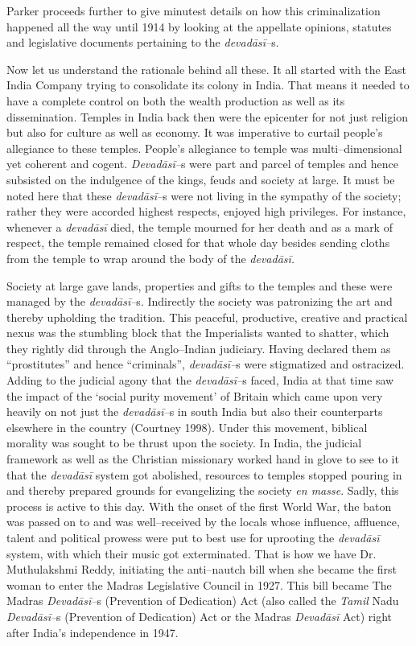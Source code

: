 Parker proceeds further to give minutest details on how this criminalization happened all the way until 1914 by looking at the appellate opinions, statutes and legislative documents pertaining to the \textit{devadāsī–}s.

Now let us understand the rationale behind all these. It all started with the East India Company trying to consolidate its colony in India. That means it needed to have a complete control on both the wealth production as well as its dissemination. Temples in India back then were the epicenter for not just religion but also for culture as well as economy. It was imperative to curtail people’s allegiance to these temples. People’s allegiance to temple was multi–dimensional yet coherent and cogent. \textit{Devadāsī–}s were part and parcel of temples and hence subsisted on the indulgence of the kings, feuds and society at large. It must be noted here that these \textit{devadāsī–}s were not living in the sympathy of the society; rather they were accorded highest respects, enjoyed high privileges. For instance, whenever a \textit{devadāsī }died, the temple mourned for her death and as a mark of respect, the temple remained closed for that whole day besides sending cloths from the temple to wrap around the body of the \textit{devadāsī.}

Society at large gave lands, properties and gifts to the temples and these were managed by the \textit{devadāsī–}s. Indirectly the society was patronizing the art and thereby upholding the tradition. This peaceful, productive, creative and practical nexus was the stumbling block that the Imperialists wanted to shatter, which they rightly did through the Anglo–Indian judiciary. Having declared them as “prostitutes” and hence “criminals”, \textit{devadāsī–}s were stigmatized and ostracized. Adding to the judicial agony that the \textit{devadāsī–}s faced, India at that time saw the impact of the ‘social purity movement’ of Britain which came upon very heavily on not just the \textit{devadāsī–}s in south India but also their counterparts elsewhere in the country (Courtney 1998). Under this movement, biblical morality was sought to be thrust upon the society. In India, the judicial framework as well as the Christian missionary worked hand in glove to see to it that the \textit{devadāsī} system got abolished, resources to temples stopped pouring in and thereby prepared grounds for evangelizing the society \textit{en masse}. Sadly, this process is active to this day. With the onset of the first World War, the baton was passed on to and was well–received by the locals whose influence, affluence, talent and political prowess were put to best use for uprooting the \textit{devadāsī} system, with which their music got exterminated. That is how we have Dr. Muthulakshmi Reddy, initiating the anti–nautch bill when she became the first woman to enter the Madras Legislative Council in 1927. This bill became The Madras \textit{Devadāsī–}s (Prevention of Dedication) Act (also called the \textit{Tamil} Nadu \textit{Devadāsī–}s (Prevention of Dedication) Act or the Madras \textit{Devadāsī} Act) right after India’s independence in 1947.

